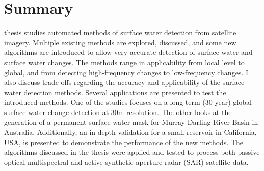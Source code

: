 \chapter*{Summary}

 thesis studies automated methods of surface water detection from satellite imagery. Multiple existing methods are explored, discussed, and some new algorithms are introduced to allow very accurate detection of surface water and surface water changes. 
The methods range in applicability from local level to global, and from detecting high-frequency changes to low-frequency changes. 
I also discuss trade-offs regarding the accuracy and applicability of the surface water detection methods.
 Several applications are presented to test the introduced methods. One of the studies focuses on a long-term (30 year) global surface water change detection at 30m resolution. The other looks at the generation of a permanent surface water mask for Murray-Darling River Basin in Australia. Additionally, an in-depth validation for a small reservoir in California, USA, is presented to demonstrate the performance of the new methods. 
The algorithms discussed in the thesis were applied and tested to process both passive optical multispectral and active synthetic aperture radar (SAR) satellite data.

